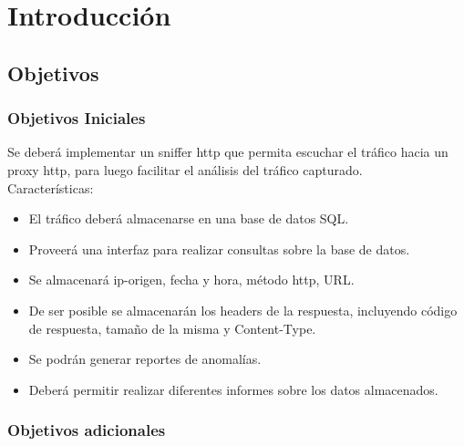 \section{Introducción}

\subsection{Objetivos}

\subsubsection{Objetivos Iniciales}

 Se deberá implementar un sniffer http que permita escuchar el tráfico hacia un proxy http, para luego facilitar el análisis del tráfico capturado.
\\
 Características:
\begin{itemize}
	\item El tráfico deberá almacenarse en una base de datos SQL.
	\item Proveerá una interfaz para realizar consultas sobre la base de datos.
	\item Se almacenará ip-origen, fecha y hora, método http, URL.
	\item De ser posible se almacenarán los headers de la respuesta, incluyendo código de respuesta, tamaño de la misma y Content-Type.
	\item Se podrán generar reportes de anomalías.
	\item Deberá permitir realizar diferentes informes sobre los datos almacenados.
\end{itemize}

\subsubsection{Objetivos adicionales}

